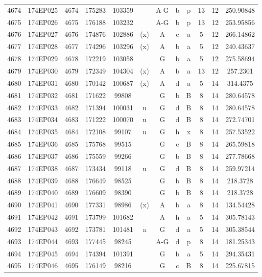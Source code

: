 \begin{tabular}{|*{12}{c|}}
4674 & 174EP025 & 4674 & 175283 & 103359 &  & A-G & b & p & 13 & 12 & 250.90848 \\ 
4675 & 174EP026 & 4675 & 176188 & 103232 &  & A-G & b & p & 13 & 12 & 253.95856 \\ 
4676 & 174EP027 & 4676 & 174876 & 102886 & (x) & A & c & a & 5 & 12 & 266.14862 \\ 
4677 & 174EP028 & 4677 & 174296 & 103296 & (x) & A & b & a & 5 & 12 & 240.43637 \\ 
4678 & 174EP029 & 4678 & 172219 & 103058 &  & G & b & a & 5 & 12 & 275.58694 \\ 
4679 & 174EP030 & 4679 & 172349 & 104304 & (x) & A & b & a & 13 & 12 & 257.2301 \\ 
4680 & 174EP031 & 4680 & 170142 & 100687 & (x) & A & d & a & 5 & 14 & 314.4375 \\ 
4681 & 174EP032 & 4681 & 171622 & 99808 &  & G & b & B & 8 & 14 & 280.64578 \\ 
4682 & 174EP033 & 4682 & 171394 & 100031 & u & G & d & B & 8 & 14 & 280.64578 \\ 
4683 & 174EP034 & 4683 & 171222 & 100070 & u & G & d & B & 8 & 14 & 272.74701 \\ 
4684 & 174EP035 & 4684 & 172108 & 99107 & u & G & h & x & 8 & 14 & 257.53522 \\ 
4685 & 174EP036 & 4685 & 175768 & 99515 &  & G & c & B & 8 & 14 & 265.59818 \\ 
4686 & 174EP037 & 4686 & 175559 & 99266 &  & G & b & B & 8 & 14 & 277.78668 \\ 
4687 & 174EP038 & 4687 & 173434 & 99118 & u & G & d & B & 8 & 14 & 259.97214 \\ 
4688 & 174EP039 & 4688 & 176649 & 98525 &  & G & b & B & 8 & 14 & 218.3728 \\ 
4689 & 174EP040 & 4689 & 176609 & 98390 &  & G & b & B & 8 & 14 & 218.3728 \\ 
4690 & 174EP041 & 4690 & 177331 & 98986 & (x) & A & b & a & 8 & 14 & 134.54428 \\ 
4691 & 174EP042 & 4691 & 173799 & 101682 &  & A & h & a & 5 & 14 & 305.78143 \\ 
4692 & 174EP043 & 4692 & 173781 & 101481 & a & G & d & a & 5 & 14 & 305.38544 \\ 
4693 & 174EP044 & 4693 & 177445 & 98245 &  & A-G & d & p & 8 & 14 & 181.25343 \\ 
4694 & 174EP045 & 4694 & 174394 & 101391 &  & G & b & a & 5 & 14 & 294.35431 \\ 
4695 & 174EP046 & 4695 & 176149 & 98216 &  & G & c & B & 8 & 14 & 225.67815 \\ 

\end{tabular}
